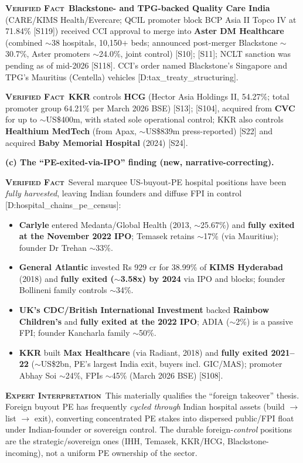 \documentclass[11pt,a4paper]{article}
\newcommand{\VF}{\textcolor{vfcol}{\textsc{\textbf{Verified Fact}}}}
\newcommand{\EI}{\textcolor{eicol}{\textsc{\textbf{Expert Interpretation}}}}
\newcommand{\cs}[1]{\textnormal{[#1]}}
\begin{document}
\VF\ \textbf{Blackstone- and TPG-backed Quality Care India} (CARE/KIMS Health/Evercare; QCIL promoter block BCP Asia II Topco IV at 71.84\% \cs{S119}) received CCI approval to merge into \textbf{Aster DM Healthcare} (combined $\sim$38 hospitals, 10{,}150$+$ beds; announced post-merger Blackstone $\sim$30.7\%, Aster promoters $\sim$24.0\%, joint control) \cs{S10}; \cs{S11}; NCLT sanction was pending as of mid-2026 \cs{S118}. CCI's order named Blackstone's Singapore and TPG's Mauritius (Centella) vehicles \cs{D:tax\_treaty\_structuring}.

\VF\ \textbf{KKR} controls \textbf{HCG} (Hector Asia Holdings II, 54.27\%; total promoter group 64.21\% per March 2026 BSE) \cs{S13}; \cs{S104}, acquired from \textbf{CVC} for up to $\sim$US\$400m, with stated sole operational control; KKR also controls \textbf{Healthium MedTech} (from Apax, $\sim$US\$839m press-reported) \cs{S22} and acquired \textbf{Baby Memorial Hospital} (2024) \cs{S24}.

\textbf{(c) The ``PE-exited-via-IPO'' finding (new, narrative-correcting).}

\VF\ Several marquee US-buyout-PE hospital positions have been \emph{fully harvested}, leaving Indian founders and diffuse FPI in control \cs{D:hospital\_chains\_pe\_census}:
\begin{itemize}[leftmargin=1.4em,itemsep=2pt]
\item \textbf{Carlyle} entered Medanta/Global Health (2013, $\sim$25.67\%) and \textbf{fully exited at the November 2022 IPO}; Temasek retains $\sim$17\% (via Mauritius); founder Dr Trehan $\sim$33\%.
\item \textbf{General Atlantic} invested Rs 929 cr for 38.99\% of \textbf{KIMS Hyderabad} (2018) and \textbf{fully exited ($\sim$3.58x) by 2024} via IPO and blocks; founder Bollineni family controls $\sim$34\%.
\item \textbf{UK's CDC/British International Investment} backed \textbf{Rainbow Children's} and \textbf{fully exited at the 2022 IPO}; ADIA ($\sim$2\%) is a passive FPI; founder Kancharla family $\sim$50\%.
\item \textbf{KKR} built \textbf{Max Healthcare} (via Radiant, 2018) and \textbf{fully exited 2021--22} ($\sim$US\$2bn, PE's largest India exit, buyers incl. GIC/MAS); promoter Abhay Soi $\sim$24\%, FPIs $\sim$45\% (March 2026 BSE) \cs{S108}.
\end{itemize}

\EI\ This materially qualifies the ``foreign takeover'' thesis. Foreign buyout PE has frequently \emph{cycled through} Indian hospital assets (build $\rightarrow$ list $\rightarrow$ exit), converting concentrated PE stakes into dispersed public/FPI float under Indian-founder or sovereign control. The durable foreign-\emph{control} positions are the strategic/sovereign ones (IHH, Temasek, KKR/HCG, Blackstone-incoming), not a uniform PE ownership of the sector.
\end{document}
